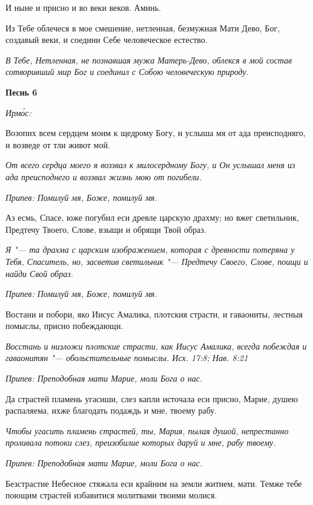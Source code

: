 И ныне и присно и во веки веков. Аминь.


Из Тебе облечеся в мое смешение, нетленная, безмужная Мати Дево, Бог, создавый веки, и соедини Себе человеческое естество.


\itshape В Тебе, Нетленная, не познавшая мужа Матерь-Дево, облекся в мой состав сотворивший мир Бог и соединил с Собою человеческую природу.\normalfont{}





\bfseries Песнь 6\normalfont{}


\itshape Ирмо́с:\normalfont{}


Возопих всем сердцем моим к щедрому Богу, и услыша мя от ада преисподняго, и возведе от тли живот мой.


\itshape От всего сердца моего я воззвал к милосердному Богу, и Он услышал меня из ада преисподнего и воззвал жизнь мою от погибели.\normalfont{}


\itshape Припев:\normalfont{} Помилуй мя, Боже, помилуй мя.


Аз есмь, Спасе, юже погубил еси древле царскую драхму; но вжег светильник, Предтечу Твоего, Слове, взыщи и обрящи Твой образ.


\itshape Я "--- та драхма с царским изображением, которая с древности потеряна у Тебя, Спаситель, но, засветив светильник "--- Предтечу Своего, Слове, поищи и найди Свой образ.\normalfont{}


\itshape Припев:\normalfont{} Помилуй мя, Боже, помилуй мя.


Востани и побори, яко Иисус Амалика, плотския страсти, и гаваониты, лестныя помыслы, присно побеждающи.


\itshape Восстань и низложи плотские страсти, как Иисус Амалика, всегда побеждая и гаваонитян "--- обольстительные помыслы. Исх. 17:8; Нав. 8:21\normalfont{}


\itshape Припев:\normalfont{} Преподобная мати Марие, моли Бога о нас.


Да страстей пламень угасиши, слез капли источала еси присно, Марие, душею распаляема, ихже благодать подаждь и мне, твоему рабу.


\itshape Чтобы угасить пламень страстей, ты, Мария, пылая душой, непрестанно проливала потоки слез, преизобилие которых даруй и мне, рабу твоему.\normalfont{}


\itshape Припев:\normalfont{} Преподобная мати Марие, моли Бога о нас.


Безстрастие Небесное стяжала еси крайним на земли житием, мати. Темже тебе поющим страстей избавитися молитвами твоими молися.


